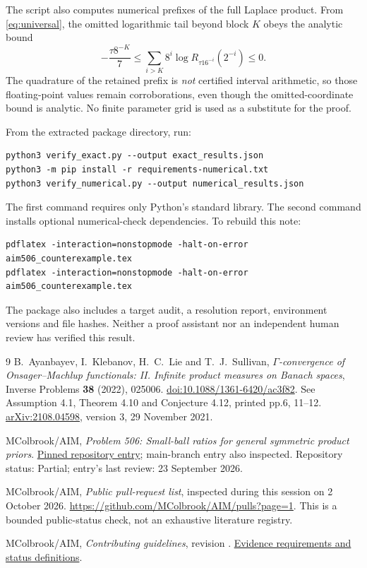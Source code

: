 \documentclass[11pt]{article}
\theoremstyle{remark}
\begin{document}
The script also computes numerical prefixes of the full Laplace product. From \eqref{eq:universal}, the omitted logarithmic tail beyond block $K$ obeys the analytic bound
\[
-\frac{\tau8^{-K}}7\le
\sum_{i>K}8^i\log R_{\tau16^{-i}}(2^{-i})\le0.
\]
The quadrature of the retained prefix is \emph{not} certified interval arithmetic, so those floating-point values remain corroborations, even though the omitted-coordinate bound is analytic. No finite parameter grid is used as a substitute for the proof.

From the extracted package directory, run:
\begin{verbatim}
python3 verify_exact.py --output exact_results.json
python3 -m pip install -r requirements-numerical.txt
python3 verify_numerical.py --output numerical_results.json
\end{verbatim}
The first command requires only Python's standard library. The second command installs optional numerical-check dependencies. To rebuild this note:
\begin{verbatim}
pdflatex -interaction=nonstopmode -halt-on-error aim506_counterexample.tex
pdflatex -interaction=nonstopmode -halt-on-error aim506_counterexample.tex
\end{verbatim}
The package also includes a target audit, a resolution report, environment versions and file hashes. Neither a proof assistant nor an independent human review has verified this result.

\begin{thebibliography}{9}
B.~Ayanbayev, I.~Klebanov, H.~C.~Lie and T.~J.~Sullivan,
\emph{$\Gamma$-convergence of Onsager--Machlup functionals: II. Infinite product measures on Banach spaces},
Inverse Problems \textbf{38} (2022), 025006.
\href{https://doi.org/10.1088/1361-6420/ac3f82}{doi:10.1088/1361-6420/ac3f82}.
See Assumption 4.1, Theorem 4.10 and Conjecture 4.12, printed pp.6, 11--12.
\href{https://arxiv.org/abs/2108.04598}{arXiv:2108.04598}, version 3, 29 November 2021.

MColbrook/AIM, \emph{Problem 506: Small-ball ratios for general symmetric product priors}.
\href{https://github.com/MColbrook/AIM/blob/aa776a01d7d48a79f93251af11fde9454b0aea95/problems/506-product-prior-small-ball-ratios.md}{Pinned repository entry}; main-branch entry also inspected.
Repository status: Partial; entry's last review: 23 September 2026.

MColbrook/AIM, \emph{Public pull-request list}, inspected during this session on 2 October 2026.
\url{https://github.com/MColbrook/AIM/pulls?page=1}.
This is a bounded public-status check, not an exhaustive literature registry.

MColbrook/AIM, \emph{Contributing guidelines}, revision
.
\href{https://github.com/MColbrook/AIM/blob/aa776a01d7d48a79f93251af11fde9454b0aea95/CONTRIBUTING.md}{Evidence requirements and status definitions}.
\end{thebibliography}
\label{LastPage}
\end{document}
